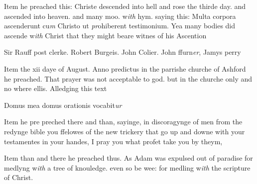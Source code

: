 \documentclass[12pt, a4paper]{book}
\begin{document}
	
		
		\ifthenelse{\isodd{\thepage}}
		{\reversemarginpar}
		{\normalmarginpar}
		Item he preached this: Christe descended into hell and rose
			the thirde day. and ascended into heaven. and many moo.
			w\textit{ith} hym. saying this: Multa corpora ascenderunt
			cu\textit{m} Christo ut \textit{pr}ohiberent
			testimonium. Yea many bodies did ascende w\textit{ith} Christ that
			they might beare witnes of his Ascention
	
	
		
		\ifthenelse{\isodd{\thepage}}
		{\reversemarginpar}
		{\normalmarginpar}
		Sir Rauff post clerke. Robert Burgeis. John Colier. John ffurn\textit{er},
			Jamys perry
	
	
	
		
		\ifthenelse{\isodd{\thepage}}
		{\reversemarginpar}
		{\normalmarginpar}
		Item the xii daye of August. Anno predictus in the parrishe
			churche of Ashford he preached. That prayer was not acceptable to god.
			but in the churche only and no where ellis. Alledging this text
	
	
		
				\marginpar[\vspace{0.5cm}{\textcolor{Gray}{proclamations}}]{}
			
		
		\ifthenelse{\isodd{\thepage}}
		{\reversemarginpar}
		{\normalmarginpar}
		Domus mea domus orationis vocabit\textit{ur}
	
	
		
		\ifthenelse{\isodd{\thepage}}
		{\reversemarginpar}
		{\normalmarginpar}
		Item he pre preched there and
			than, sayinge, in discoragynge of men from the
				redynge bible
			 you ffelowes of the new trickery that go up
			and downe with your testamentes in your handes, I pray you what
			profet take you by theym,
			
	
	
		
				\marginpar[\vspace{0.5cm}{\textcolor{Gray}{n}}]{}
			
		
		\ifthenelse{\isodd{\thepage}}
		{\reversemarginpar}
		{\normalmarginpar}
		Item than and there he preached thus. As Adam was expulsed
			out of paradise for medlyng w\textit{ith} a tree of knouledge.
			even so be wee: for medling w\textit{ith} the scripture of
			Christ.
	
\end{document}
